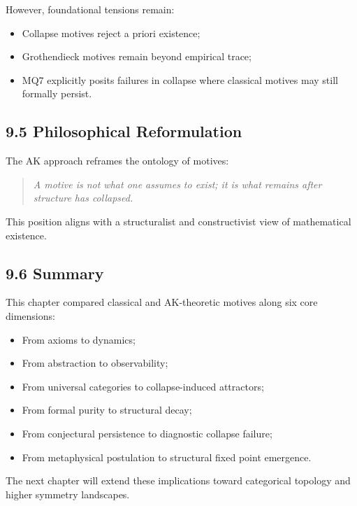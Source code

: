 \documentclass[11pt]{article}
\begin{document}
However, foundational tensions remain:

\begin{itemize}
    \item Collapse motives reject a priori existence;
    \item Grothendieck motives remain beyond empirical trace;
    \item MQ7 explicitly posits failures in collapse where classical motives may still formally persist.
\end{itemize}

\subsection{9.5 Philosophical Reformulation}

The AK approach reframes the ontology of motives:

\begin{quote}
    \emph{A motive is not what one assumes to exist; it is what remains after structure has collapsed.}
\end{quote}

This position aligns with a structuralist and constructivist view of mathematical existence.

\subsection{9.6 Summary}

This chapter compared classical and AK-theoretic motives along six core dimensions:

\begin{itemize}
    \item From axioms to dynamics;
    \item From abstraction to observability;
    \item From universal categories to collapse-induced attractors;
    \item From formal purity to structural decay;
    \item From conjectural persistence to diagnostic collapse failure;
    \item From metaphysical postulation to structural fixed point emergence.
\end{itemize}

The next chapter will extend these implications toward categorical topology and higher symmetry landscapes.

\FloatBarrier
\end{document}
